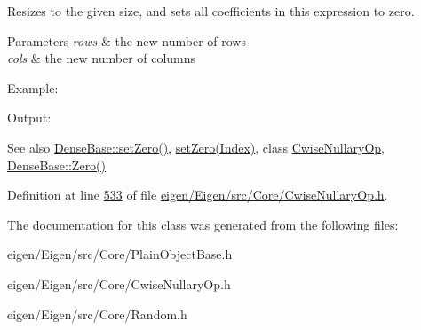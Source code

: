 Resizes to the given size, and sets all coefficients in this expression to zero.


\begin{DoxyParams}{Parameters}
{\em rows} & the new number of rows \\
\hline
{\em cols} & the new number of columns\\
\hline
\end{DoxyParams}
Example\+: 
\begin{DoxyCodeInclude}
\end{DoxyCodeInclude}
 Output\+: 
\begin{DoxyVerbInclude}
\end{DoxyVerbInclude}


\begin{DoxySeeAlso}{See also}
\hyperlink{group___core___module_ac74411ddeea2545bf20baf14613be47e}{Dense\+Base\+::set\+Zero()}, \hyperlink{class_eigen_1_1_plain_object_base_ac21ad5f989f320e46958b75ac8d9a1da}{set\+Zero(\+Index)}, class \hyperlink{group___core___module_class_eigen_1_1_cwise_nullary_op}{Cwise\+Nullary\+Op}, \hyperlink{group___core___module_a8c4be762b10041d64a2b2ce85bb14ba0}{Dense\+Base\+::\+Zero()} 
\end{DoxySeeAlso}


Definition at line \hyperlink{eigen_2_eigen_2src_2_core_2_cwise_nullary_op_8h_source_l00533}{533} of file \hyperlink{eigen_2_eigen_2src_2_core_2_cwise_nullary_op_8h_source}{eigen/\+Eigen/src/\+Core/\+Cwise\+Nullary\+Op.\+h}.



The documentation for this class was generated from the following files\+:\begin{DoxyCompactItemize}
\item 
eigen/\+Eigen/src/\+Core/\+Plain\+Object\+Base.\+h\item 
eigen/\+Eigen/src/\+Core/\+Cwise\+Nullary\+Op.\+h\item 
eigen/\+Eigen/src/\+Core/\+Random.\+h\end{DoxyCompactItemize}
